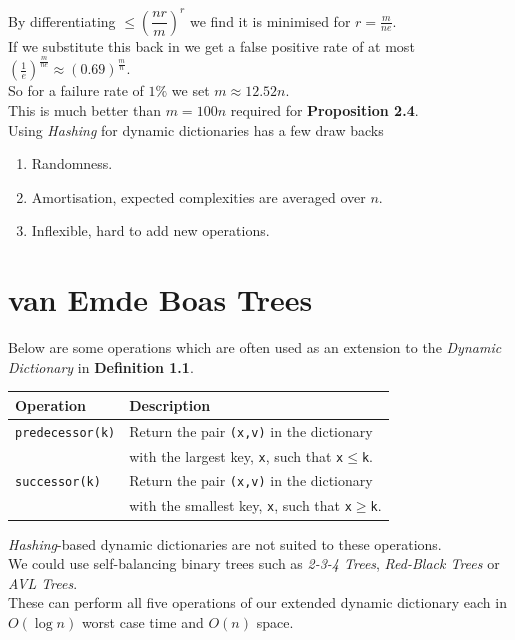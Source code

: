\documentclass[11pt,a4paper]{article}
\begin{document}
By differentiating $\leq\left(\dfrac{nr}{m}\right)^r$ we find it is minimised for $r=\frac{m}{ne}$.\\
If we substitute this back in we get a false positive rate of at most $\left(\frac1e\right)^{\frac{m}{ne}}\approx(0.69)^\frac{m}{n}$.\\
So for a failure rate of $1\%$ we set $m\approx12.52 n$.\\
This is much better than $m=100n$ required for \textbf{Proposition 2.4}.\\

Using \textit{Hashing} for dynamic dictionaries has a few draw backs
\begin{enumerate}
	\item Randomness.
	\item Amortisation, \ie expected complexities are averaged over $n$.
	\item Inflexible, hard to add new operations.
\end{enumerate}

\section{van Emde Boas Trees}

Below are some operations which are often used as an extension to the \textit{Dynamic Dictionary} in \textbf{Definition 1.1}.
\begin{center}
\begin{tabular}{l|l}
\textbf{Operation}&\textbf{Description}\\\hline
\lstinline!predecessor(k)!&Return the pair \lstinline!(x,v)! in the dictionary\\
&with the largest key,  \lstinline!x!, such that \lstinline!x!$\leq$\lstinline!k!.\\
\lstinline!successor(k)!&Return the pair \lstinline!(x,v)! in the dictionary\\
&with the smallest key,  \lstinline!x!, such that \lstinline!x!$\geq$\lstinline!k!.\\
\end{tabular}
\end{center}
\nb \textit{Hashing}-based dynamic dictionaries are not suited to these operations.\\

We could use self-balancing binary trees such as \textit{2-3-4 Trees}, \textit{Red-Black Trees} or \textit{AVL Trees}.\\
These can perform all five operations of our extended dynamic dictionary each in $O(\log n)$ worst case time and $O(n)$ space.\\
\end{document}
